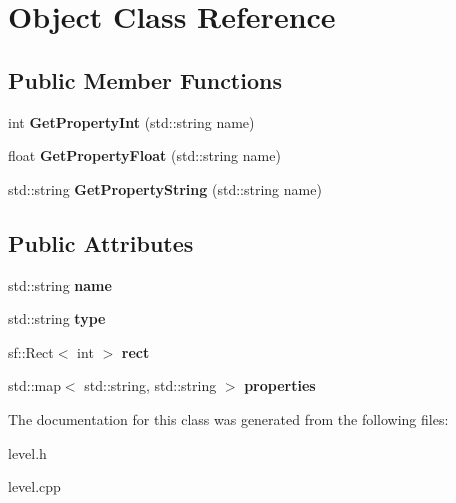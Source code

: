 \hypertarget{class_object}{}\section{Object Class Reference}
\label{class_object}
\subsection*{Public Member Functions}
\begin{DoxyCompactItemize}
\item 
\mbox{\label{class_object_a3508bb776edb1139d41c10c1302a532a}} 
int {\bfseries Get\+Property\+Int} (std\+::string name)
\item 
\mbox{\label{class_object_addc3379119fd3cc698ff466c9d371f30}} 
float {\bfseries Get\+Property\+Float} (std\+::string name)
\item 
\mbox{\label{class_object_a3979e6a58390fb4244535f320a3e5db8}} 
std\+::string {\bfseries Get\+Property\+String} (std\+::string name)
\end{DoxyCompactItemize}
\subsection*{Public Attributes}
\begin{DoxyCompactItemize}
\item 
\mbox{\label{class_object_a24457e0a387492c80594aec7681a2277}} 
std\+::string {\bfseries name}
\item 
\mbox{\label{class_object_a2f0ab0ca2d98028fd10807a03fcd75e5}} 
std\+::string {\bfseries type}
\item 
\mbox{\label{class_object_a800c7b81397ba0e59f2824c8e405ee15}} 
sf\+::\+Rect$<$ int $>$ {\bfseries rect}
\item 
\mbox{\label{class_object_af4ca2590a9451ea032eb5aa1f7c799a0}} 
std\+::map$<$ std\+::string, std\+::string $>$ {\bfseries properties}
\end{DoxyCompactItemize}


The documentation for this class was generated from the following files\+:\begin{DoxyCompactItemize}
\item 
level.\+h\item 
level.\+cpp\end{DoxyCompactItemize}
